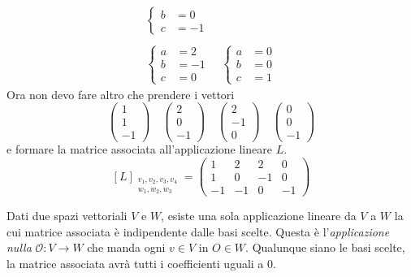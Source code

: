 \begin{example}
\begin{gather*}
\begin{cases}
			b & = 0  \\
			c & = -1
		\end{cases} \\
		\\
		\begin{cases}
			a & = 2  \\
			b & = -1 \\
			c & = 0
		\end{cases}
		\quad
		\begin{cases}
			a & = 0 \\
			b & = 0 \\
			c & = 1
		\end{cases}
	\end{gather*}
	Ora non devo fare altro che prendere i vettori
	\[
		\begin{pmatrix}
			1 \\ 1 \\ -1
		\end{pmatrix}
		\quad
		\begin{pmatrix}
			2 \\ 0 \\ -1
		\end{pmatrix}
		\quad
		\begin{pmatrix}
			2 \\ -1 \\ 0
		\end{pmatrix}
		\quad
		\begin{pmatrix}
			0 \\ 0 \\ -1
		\end{pmatrix}
	\]
	e formare la matrice associata all'applicazione lineare $L$.
	\[
		[L]_{\substack{v_1, v_2, v_3, v_4 \\
					w_1, w_2, w_3}} =
		\begin{pmatrix}
			1  & 2  & 2  & 0  \\
			1  & 0  & -1 & 0  \\
			-1 & -1 & 0  & -1
		\end{pmatrix}
	\]
\end{example}

\begin{observation}
	Dati due spazi vettoriali $V$ e $W$, esiste una sola applicazione lineare da $V$ a $W$ la cui matrice
	associata è indipendente dalle basi scelte. Questa è l'\emph{applicazione nulla}
	$\mathcal{O} : V \rightarrow W$ che manda ogni $v \in V$ in $O \in W$. Qualunque siano le basi scelte, la
	matrice associata avrà tutti i coefficienti uguali a $0$.
\end{observation}

